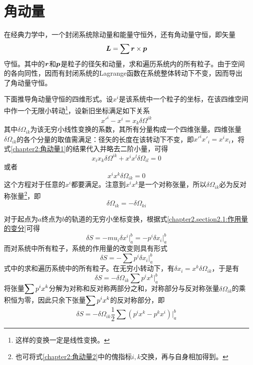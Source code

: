 \section{角动量}

在经典力学中，一个封闭系统除动量和能量守恒外，还有角动量守恒，即矢量
\begin{equation*}
	\boldsymbol{L} = \sum \boldsymbol{r}\times \boldsymbol{p}
\end{equation*}
守恒。其中的$\boldsymbol{r}$和$\boldsymbol{p}$是粒子的径矢和动量，求和遍历系统内的所有粒子。由于空间的各向同性，因而有封闭系统的Lagrange函数在系统整体转动下不变，因而导出了角动量守恒。

下面推导角动量守恒的四维形式。设$x^i$是该系统中一个粒子的坐标，在该四维空间中作一个无限小转动\footnote{这样的变换一定是线性变换。}，设新旧坐标满足如下关系
\begin{equation}
	x'^i-x^i = x_k\delta \varOmega^{ik}
	\label{chapter2:角动量1}
\end{equation}
其中$\delta \varOmega_{ik}$为该无穷小线性变换的系数，其所有分量构成一个四维张量。四维张量$\delta\varOmega_{ik}$的各个分量的取值需满足：径矢的长度在该转动下不变，即$x'^ix'_i = x^ix_i$，将式\eqref{chapter2:角动量1}的结果代入并略去二阶小量，可得
\begin{equation*}
	x_ix_k\delta \varOmega^{ik}+x^ix^l\delta \varOmega_{il} = 0
\end{equation*}
或者
\begin{equation}
	x^ix^k \delta\varOmega_{ik} = 0
	\label{chapter2:角动量2}
\end{equation}
这个方程对于任意的$x^i$都要满足。注意到$x^ix^k$是一个对称张量，所以$\delta\varOmega_{ik}$必为反对称张量\footnote{也可将式\eqref{chapter2:角动量2}中的傀指标$i, k$交换，再与自身相加得到。}，即
\begin{equation}
	\delta \varOmega_{ik} = -\delta \varOmega_{ki}
	\label{chapter2:角动量3}
\end{equation}

对于起点为$a$终点为$b$的轨道的无穷小坐标变换，根据式\eqref{chapter2.section2.1:作用量的变分}可得
\begin{equation*}
	\delta S = -mu_i\delta x^i \big|_a^b = -p^i\delta x_i\big|_a^b
\end{equation*}
而对系统中所有粒子，系统的作用量的改变则具有形式
\begin{equation*}
	\delta S = -\sum p^i\delta x_i\Big|_a^b
\end{equation*}
式中的求和遍历系统中的所有粒子。在无穷小转动下，有$\delta x_i = x^k\delta \varOmega_{ik}$，于是有
\begin{equation*}
	\delta S = -\delta \varOmega_{ik} \sum p^ix^k\Big|_a^b
\end{equation*}
将张量$\displaystyle\sum p^ix^k$分解为对称和反对称两部分之和，对称部分与反对称张量$\delta \varOmega_{ik}$的乘积恒为零，因此只余下张量$\displaystyle\sum p^ix^k$的反对称部分，即
\begin{equation}
	\delta S = -\delta \varOmega_{ik} \frac12 \sum (p^ix^k-p^kx^i)\Big|_a^b
	\label{chapter2:角动量4}
\end{equation}

